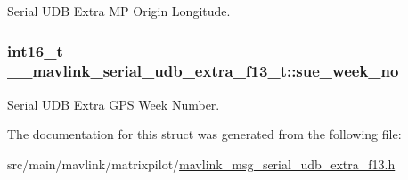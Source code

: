 Serial U\+D\+B Extra M\+P Origin Longitude. 

\hypertarget{struct____mavlink__serial__udb__extra__f13__t_a034ddec76787d3cb2dd00994c723b638}{
\subsubsection[{sue\+\_\+week\+\_\+no}]{\setlength{\rightskip}{0pt plus 5cm}int16\+\_\+t \+\_\+\+\_\+mavlink\+\_\+serial\+\_\+udb\+\_\+extra\+\_\+f13\+\_\+t\+::sue\+\_\+week\+\_\+no}}\label{struct____mavlink__serial__udb__extra__f13__t_a034ddec76787d3cb2dd00994c723b638}


Serial U\+D\+B Extra G\+P\+S Week Number. 



The documentation for this struct was generated from the following file\+:\begin{DoxyCompactItemize}
\item 
src/main/mavlink/matrixpilot/\hyperlink{mavlink__msg__serial__udb__extra__f13_8h}{mavlink\+\_\+msg\+\_\+serial\+\_\+udb\+\_\+extra\+\_\+f13.\+h}\end{DoxyCompactItemize}
